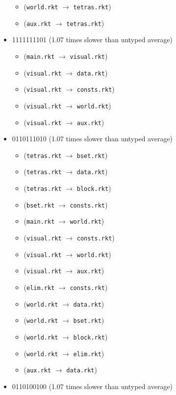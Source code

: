 \documentclass{article}
\newcommand{\mono}[1]{\texttt{#1}}
\begin{document}
\begin{itemize}
\begin{itemize}
  \item (\mono{world.rkt} $\rightarrow$ \mono{tetras.rkt})
  \item (\mono{aux.rkt} $\rightarrow$ \mono{tetras.rkt})
  \end{itemize}
\item 1111111101 (1.07 times slower than untyped average)
  \begin{itemize}
  \item (\mono{main.rkt} $\rightarrow$ \mono{visual.rkt})
  \item (\mono{visual.rkt} $\rightarrow$ \mono{data.rkt})
  \item (\mono{visual.rkt} $\rightarrow$ \mono{consts.rkt})
  \item (\mono{visual.rkt} $\rightarrow$ \mono{world.rkt})
  \item (\mono{visual.rkt} $\rightarrow$ \mono{aux.rkt})
  \end{itemize}
\item 0110111010 (1.07 times slower than untyped average)
  \begin{itemize}
  \item (\mono{tetras.rkt} $\rightarrow$ \mono{bset.rkt})
  \item (\mono{tetras.rkt} $\rightarrow$ \mono{data.rkt})
  \item (\mono{tetras.rkt} $\rightarrow$ \mono{block.rkt})
  \item (\mono{bset.rkt} $\rightarrow$ \mono{consts.rkt})
  \item (\mono{main.rkt} $\rightarrow$ \mono{world.rkt})
  \item (\mono{visual.rkt} $\rightarrow$ \mono{consts.rkt})
  \item (\mono{visual.rkt} $\rightarrow$ \mono{world.rkt})
  \item (\mono{visual.rkt} $\rightarrow$ \mono{aux.rkt})
  \item (\mono{elim.rkt} $\rightarrow$ \mono{consts.rkt})
  \item (\mono{world.rkt} $\rightarrow$ \mono{data.rkt})
  \item (\mono{world.rkt} $\rightarrow$ \mono{bset.rkt})
  \item (\mono{world.rkt} $\rightarrow$ \mono{block.rkt})
  \item (\mono{world.rkt} $\rightarrow$ \mono{elim.rkt})
  \item (\mono{aux.rkt} $\rightarrow$ \mono{data.rkt})
  \end{itemize}
\item 0110100100 (1.07 times slower than untyped average)

\end{itemize}
\end{document}
